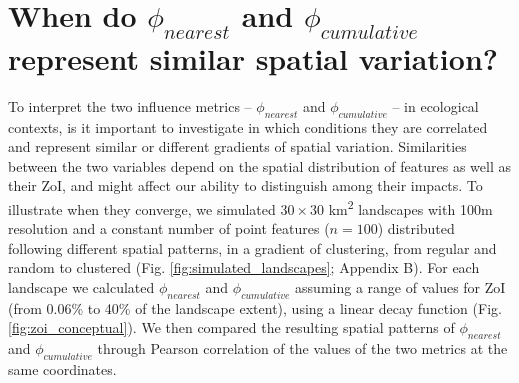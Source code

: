\documentclass[titlepage]{article}
\begin{document}
\section{When do $\phi_{nearest}$ and $\phi_{cumulative}$ represent similar spatial variation?}

To interpret the two influence metrics -- $\phi_{nearest}$ and $\phi_{cumulative}$ -- in ecological contexts, is it important to investigate in which conditions they are correlated and represent similar or different gradients of spatial variation. Similarities between the two variables depend on the spatial distribution of features as well as their ZoI, and might affect our ability to distinguish among their impacts. To illustrate when they converge, we simulated $30 \times 30$ km\textsuperscript{2} landscapes with 100m resolution and a constant number of point features ($n = 100$) distributed following different spatial patterns, in a gradient of clustering, from regular and random to clustered (Fig. \ref{fig:simulated_landscapes}; Appendix B). For each landscape we calculated $\phi_{nearest}$ and $\phi_{cumulative}$ assuming a range of values for ZoI (from 0.06\% to 40\% of the landscape extent), using a linear decay function (Fig. \ref{fig:zoi_conceptual}). We then compared the resulting spatial patterns of $\phi_{nearest}$ and $\phi_{cumulative}$ through Pearson correlation of the values of the two metrics at the same coordinates. 
\end{document}
